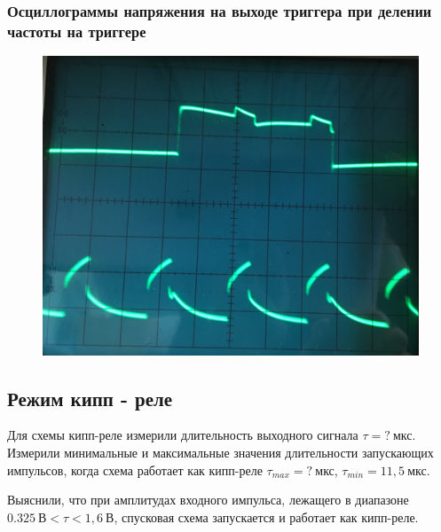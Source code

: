 \documentclass[a4paper,14pt]{extarticle}
\begin{document}
\subsubsection*{Осциллограммы напряжения на выходе триггера при делении частоты на триггере}
\begin{figure}[H]
	\centering
	\includegraphics[width=0.6\linewidth]{photo/IMG_3248}
\end{figure}
\subsection*{Режим кипп - реле}
Для схемы кипп-реле измерили длительность выходного сигнала $\tau = ?\:\text{мкс}$. Измерили минимальные и максимальные значения длительности запускающих импульсов, когда схема работает как кипп-реле $\tau_{max} = ?\:\text{мкс}$, $\tau_{min} = 11,5\:\text{мкс}$.

Выяснили, что при амплитудах входного импульса, лежащего в диапазоне $0.325\:\text{В}<\tau<1,6\:\text{В}$, спусковая схема запускается и работает как кипп-реле.
\end{document}
